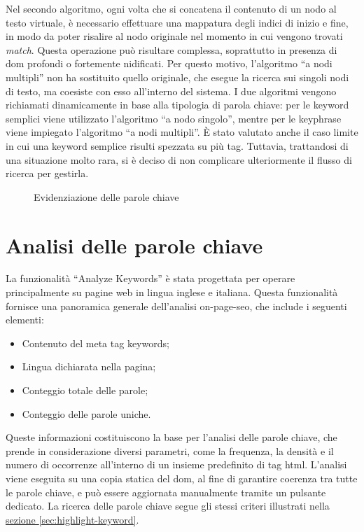 \vspace{10pt}
\par\noindent Nel secondo algoritmo, ogni volta che si concatena il contenuto di un nodo al testo virtuale, è necessario effettuare una mappatura degli indici di inizio e fine, in modo da poter risalire al nodo originale nel momento in cui vengono trovati \textit{match}. Questa operazione può risultare complessa, soprattutto in presenza di \gls{dom} profondi o fortemente nidificati. Per questo motivo, l’algoritmo “a nodi multipli” non ha sostituito quello originale, che esegue la ricerca sui singoli nodi di testo, ma coesiste con esso all’interno del sistema. I due algoritmi vengono richiamati dinamicamente in base alla tipologia di parola chiave: per le keyword semplici viene utilizzato l’algoritmo “a nodo singolo”, mentre per le keyphrase viene impiegato l’algoritmo “a nodi multipli”. È stato valutato anche il caso limite in cui una keyword semplice risulti spezzata su più tag. Tuttavia, trattandosi di una situazione molto rara, si è deciso di non complicare ulteriormente il flusso di ricerca per gestirla.

\begin{figure}[H]
  \centering 
  \caption{Evidenziazione delle parole chiave}
\end{figure}

\section{Analisi delle parole chiave}
\label{sec:analyze-keyword}

\par La funzionalità “Analyze Keywords” è stata progettata per operare principalmente su pagine web in lingua inglese e italiana. Questa funzionalità fornisce una panoramica generale dell'analisi \gls{on-page-seo}, che include i seguenti elementi:
\begin{itemize}
  \item Contenuto del meta tag keywords;
  \item Lingua dichiarata nella pagina;
  \item Conteggio totale delle parole;
  \item Conteggio delle parole uniche.
\end{itemize}

\vspace{5pt}
\par\noindent Queste informazioni costituiscono la base per l'analisi delle parole chiave, che prende in considerazione diversi parametri, come la frequenza, la densità e il numero di occorrenze all’interno di un insieme predefinito di tag \gls{html}. L'analisi viene eseguita su una copia statica del \gls{dom}, al fine di garantire coerenza tra tutte le parole chiave, e può essere aggiornata manualmente tramite un pulsante dedicato. La ricerca delle parole chiave segue gli stessi criteri illustrati nella \hyperref[sec:highlight-keyword]{sezione \textsection\ref*{sec:highlight-keyword}}.

